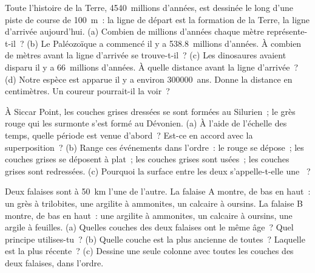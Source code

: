 \begin{exercise}[$\star\star$]\label{exo:g7:geological-time:8}
Toute l'histoire de la Terre, \num{4540}~millions d'années, est dessinée
le long d'une piste de course de \qty{100}{m}~: la ligne de départ est la
formation de la Terre, la ligne d'arrivée aujourd'hui. (a) Combien de
millions d'années chaque mètre représente-t-il~? (b) Le Paléozoïque a
commencé il y a \num{538.8}~millions d'années. À combien de mètres avant la
ligne d'arrivée se trouve-t-il~? (c) Les dinosaures avaient disparu il y a
\num{66}~millions d'années. À quelle distance avant la ligne d'arrivée~?
(d) Notre espèce est apparue il y a environ \num{300000}~ans. Donne la
distance en centimètres. Un coureur pourrait-il la voir~?
\end{exercise}

\begin{exercise}[$\star\star$]\label{exo:g7:geological-time:9}
À Siccar Point, les couches grises dressées se sont formées au
Silurien~; le grès rouge qui les surmonte s'est formé au Dévonien. (a) À
l'aide de l'échelle des temps, quelle période est venue d'abord~? Est-ce
en accord avec la superposition~? (b) Range ces événements dans l'ordre~:
le  rouge se dépose~; les couches grises se déposent à plat~; les
couches grises sont usées~; les couches grises sont redressées. (c)
Pourquoi la surface entre les deux  s'appelle-t-elle une
~?
\end{exercise}

\begin{exercise}[$\star\star$]\label{exo:g7:geological-time:10}
Deux falaises sont à \qty{50}{km} l'une de l'autre. La falaise A montre,
de bas en haut~: un grès à trilobites, une argilite à ammonites, un
calcaire à oursins. La falaise B montre, de bas en haut~: une argilite à
ammonites, un calcaire à oursins, une argile à feuilles. (a) Quelles
couches des deux falaises ont le même âge~? Quel principe utilises-tu~?
(b) Quelle couche est la plus ancienne de toutes~? Laquelle est la plus
récente~? (c) Dessine une seule colonne avec toutes les couches des deux
falaises, dans l'ordre.
\end{exercise}

